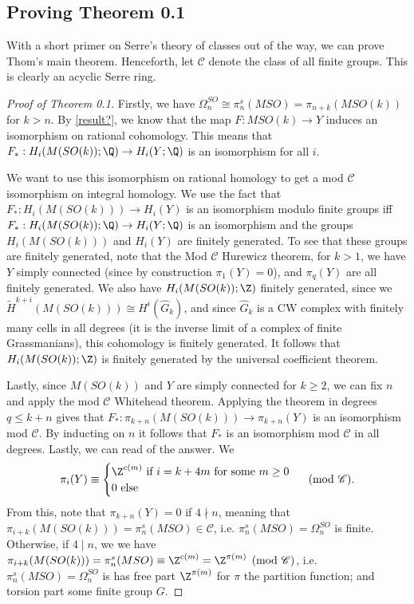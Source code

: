 \subsection{Proving Theorem 0.1}
With a short primer on Serre's theory of classes out of the way, we can prove Thom's main theorem. Henceforth, let $\mathscr C$ denote the class of all finite groups. This is clearly an acyclic Serre ring. 
\begin{proof}[Proof of Theorem 0.1]
Firstly, we have $\Omega_n^{SO}\cong \pi_n^s(MSO)=\pi_{n+k}(MSO(k))$ for $k>n$. By \ref{result?}, we know that the map $F:MSO(k)\to Y$ induces an isomorphism on rational cohomology. This means that $F_*:H_i(M(SO(k));\Q)\to H_i(Y;\Q)$ is an isomorphism for all $i$. 

We want to use this isomorphism on rational homology to get a mod $\mathscr C$ isomorphism on integral homology. We use the fact that $F_*:H_i(M(SO(k)))\to H_i(Y)$ is an isomorphism modulo finite groups iff $F_*:H_i(M(SO(k));\Q)\to H_i(Y;\Q)$ is an isomorphism and the groups $H_i(M(SO(k)))$ and $ H_i(Y)$ are finitely generated. To see that these groups are finitely generated, note that the Mod $\mathscr C$ Hurewicz theorem, for $k>1$, we have $Y$ simply connected (since by construction $\pi_1(Y)=0$), and $\pi_q(Y)$ are all finitely generated. We also have $H_i(M(SO(k));\Z)$ finitely generated, since we $\widetilde H^{k+i}(M(SO(k)))\cong H^i(\widehat G_k)$, and since $\widehat G_k$ is a CW complex with finitely many cells in all degrees (it is the inverse limit of a complex of finite Grassmanians), this cohomology is finitely generated. It follows that $H_i(M(SO(k));\Z)$ is finitely generated by the universal coefficient theorem.

Lastly, since $M(SO(k))$ and $Y$ are simply connected for $k\geq 2$, we can fix $n$ and apply the mod $\mathscr C$ Whitehead theorem. Applying the theorem in degrees $q\leq k+n$ gives that $F_*:\pi_{k+n}(M(SO(k)))\to \pi_{k+n}(Y)$ is an isomorphism mod $\mathscr C$. By inducting on $n$ it follows that $F_*$ is an isomorphism mod $\mathscr C$ in all degrees. Lastly, we can read of the answer. We 
\[\pi_i(Y)\equiv \begin{cases}
    \Z^{c(m)}\text{ if }i=k+4m\text{ for some }m\geq 0\\
    0\text{ else }
\end{cases}\pmod{\mathscr C}.\]
From this, note that $\pi_{k+n}(Y)=0$ if $4\nmid n$, meaning that $\pi_{i+k}(M(SO(k)))=\pi_n^s(MSO)\in \mathscr C$, i.e. $\pi_n^s(MSO)=\Omega_n^{SO}$ is finite. Otherwise, if $4\mid n$, we we have $\pi_{i+k}(M(SO(k)))=\pi_n^s(MSO)\equiv \Z^{c(m)}=\Z^{\pi(m)} \pmod{\mathscr C}$, i.e. $\pi_n^s(MSO)=\Omega_n^{SO}$ is has free part $\Z^{\pi(m)}$ for $\pi$ the partition function; and torsion part some finite group $G$.
    

\end{proof}









% 
% 
% 
